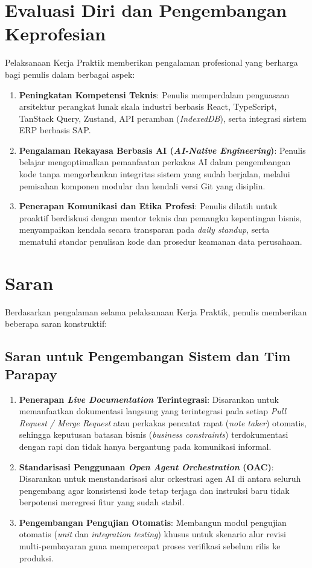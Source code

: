 \section{Evaluasi Diri dan Pengembangan Keprofesian}
Pelaksanaan Kerja Praktik memberikan pengalaman profesional yang berharga bagi penulis dalam berbagai aspek:
\begin{enumerate}[label=\arabic*)]
  \item \textbf{Peningkatan Kompetensi Teknis}: Penulis memperdalam penguasaan arsitektur perangkat lunak skala industri berbasis React, TypeScript, TanStack Query, Zustand, API peramban (\textit{IndexedDB}), serta integrasi sistem ERP berbasis SAP.
  \item \textbf{Pengalaman Rekayasa Berbasis AI (\textit{AI-Native Engineering})}: Penulis belajar mengoptimalkan pemanfaatan perkakas AI dalam pengembangan kode tanpa mengorbankan integritas sistem yang sudah berjalan, melalui pemisahan komponen modular dan kendali versi Git yang disiplin.
  \item \textbf{Penerapan Komunikasi dan Etika Profesi}: Penulis dilatih untuk proaktif berdiskusi dengan mentor teknis dan pemangku kepentingan bisnis, menyampaikan kendala secara transparan pada \textit{daily standup}, serta mematuhi standar penulisan kode dan prosedur keamanan data perusahaan.
\end{enumerate}

\section{Saran}
Berdasarkan pengalaman selama pelaksanaan Kerja Praktik, penulis memberikan beberapa saran konstruktif:

\subsection{Saran untuk Pengembangan Sistem dan Tim Parapay}
\begin{enumerate}[label=\arabic*)]
  \item \textbf{Penerapan \textit{Live Documentation} Terintegrasi}: Disarankan untuk memanfaatkan dokumentasi langsung yang terintegrasi pada setiap \textit{Pull Request / Merge Request} atau perkakas pencatat rapat (\textit{note taker}) otomatis, sehingga keputusan batasan bisnis (\textit{business constraints}) terdokumentasi dengan rapi dan tidak hanya bergantung pada komunikasi informal.
  \item \textbf{Standarisasi Penggunaan \textit{Open Agent Orchestration} (OAC)}: Disarankan untuk menstandarisasi alur orkestrasi agen AI di antara seluruh pengembang agar konsistensi kode tetap terjaga dan instruksi baru tidak berpotensi meregresi fitur yang sudah stabil.
  \item \textbf{Pengembangan Pengujian Otomatis}: Membangun modul pengujian otomatis (\textit{unit} dan \textit{integration testing}) khusus untuk skenario alur revisi multi-pembayaran guna mempercepat proses verifikasi sebelum rilis ke produksi.
\end{enumerate}

